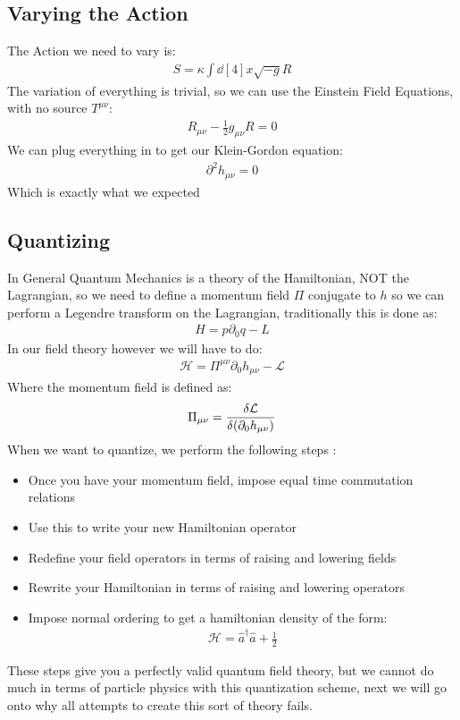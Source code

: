 \documentclass[12pt]{article}
\renewcommand{\L}{\mathcal{L}}
\renewcommand{\H}{\mathcal{H}}
\newcommand{\D}{\partial}
\newcommand{\ddst}{\dd[4]{x}}
\newcommand{\munu}{{\mu\nu}}
\begin{document}
\subsection{Varying the Action}
The Action we need to vary is:
\begin{align*}
  S=\kappa\int\ddst\sqrt{-g}R
\end{align*}
The variation of everything is trivial, so we can use the Einstein Field Equations, with no source $T^\munu$:
\begin{align*}
  R_\munu-\frac12g_\munu R=0
\end{align*}
We can plug everything in to get our Klein-Gordon equation:
\begin{align*}
  \boxed{\D^2h_\munu=0}
\end{align*}
Which is exactly what we expected
\subsection{Quantizing}
In General Quantum Mechanics is a theory of the Hamiltonian, NOT the Lagrangian, so we need to define a momentum field $\Pi$ conjugate to $h$ so we can perform a Legendre transform on the Lagrangian, traditionally this is done as:
\begin{align*}
  H=p\D_0q-L
\end{align*}
In our field theory however we will have to do:
\begin{align*}
  \H=\Pi^\munu\D_0h_\munu-\L
\end{align*}
Where the momentum field is defined as:
\begin{align*}
  \Pi_\munu=\fdv{\L}{(\D_0h_\munu)}
\end{align*}
When we want to quantize, we perform the following steps \cite{qftga}:
\begin{itemize}
\item Once you have your momentum field, impose equal time commutation relations
\item Use this to write your new Hamiltonian operator
\item Redefine your field operators in terms of raising and lowering fields
\item Rewrite your Hamiltonian in terms of raising and lowering operators
\item Impose normal ordering to get a hamiltonian density of the form:
  \begin{align*}
    \H=\hat{a}^\dag\hat{a}+\frac{1}{2}
  \end{align*}
\end{itemize}
These steps give you a perfectly valid quantum field theory, but we cannot do much in terms of particle physics with this quantization scheme, next we will go onto why all attempts to create this sort of theory fails.
\end{document}
